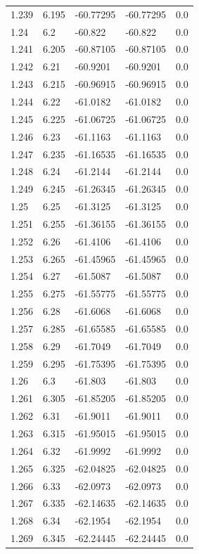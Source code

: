 \begin{tabular}{lllll}
1.239 & 6.195 & -60.77295 & -60.77295 & 0.0 \\
1.24 & 6.2 & -60.822 & -60.822 & 0.0 \\
1.241 & 6.205 & -60.87105 & -60.87105 & 0.0 \\
1.242 & 6.21 & -60.9201 & -60.9201 & 0.0 \\
1.243 & 6.215 & -60.96915 & -60.96915 & 0.0 \\
1.244 & 6.22 & -61.0182 & -61.0182 & 0.0 \\
1.245 & 6.225 & -61.06725 & -61.06725 & 0.0 \\
1.246 & 6.23 & -61.1163 & -61.1163 & 0.0 \\
1.247 & 6.235 & -61.16535 & -61.16535 & 0.0 \\
1.248 & 6.24 & -61.2144 & -61.2144 & 0.0 \\
1.249 & 6.245 & -61.26345 & -61.26345 & 0.0 \\
1.25 & 6.25 & -61.3125 & -61.3125 & 0.0 \\
1.251 & 6.255 & -61.36155 & -61.36155 & 0.0 \\
1.252 & 6.26 & -61.4106 & -61.4106 & 0.0 \\
1.253 & 6.265 & -61.45965 & -61.45965 & 0.0 \\
1.254 & 6.27 & -61.5087 & -61.5087 & 0.0 \\
1.255 & 6.275 & -61.55775 & -61.55775 & 0.0 \\
1.256 & 6.28 & -61.6068 & -61.6068 & 0.0 \\
1.257 & 6.285 & -61.65585 & -61.65585 & 0.0 \\
1.258 & 6.29 & -61.7049 & -61.7049 & 0.0 \\
1.259 & 6.295 & -61.75395 & -61.75395 & 0.0 \\
1.26 & 6.3 & -61.803 & -61.803 & 0.0 \\
1.261 & 6.305 & -61.85205 & -61.85205 & 0.0 \\
1.262 & 6.31 & -61.9011 & -61.9011 & 0.0 \\
1.263 & 6.315 & -61.95015 & -61.95015 & 0.0 \\
1.264 & 6.32 & -61.9992 & -61.9992 & 0.0 \\
1.265 & 6.325 & -62.04825 & -62.04825 & 0.0 \\
1.266 & 6.33 & -62.0973 & -62.0973 & 0.0 \\
1.267 & 6.335 & -62.14635 & -62.14635 & 0.0 \\
1.268 & 6.34 & -62.1954 & -62.1954 & 0.0 \\
1.269 & 6.345 & -62.24445 & -62.24445 & 0.0 \\

\end{tabular}

